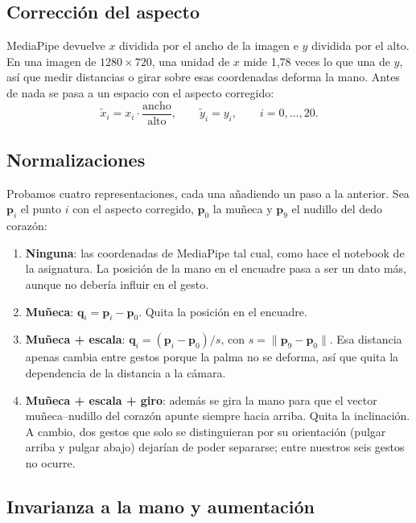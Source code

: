 \documentclass[11pt,a4paper]{article}
\begin{document}
\subsection{Corrección del aspecto}

MediaPipe devuelve $x$ dividida por el ancho de la imagen e $y$ dividida por el alto. En una imagen de
$1280\times720$, una unidad de $x$ mide 1,78 veces lo que una de $y$, así que medir distancias o girar sobre esas
coordenadas deforma la mano. Antes de nada se pasa a un espacio con el aspecto corregido:
\[
  \tilde{x}_i = x_i \cdot \frac{\text{ancho}}{\text{alto}}, \qquad \tilde{y}_i = y_i, \qquad i = 0, \dots, 20 .
\]

\subsection{Normalizaciones}

Probamos cuatro representaciones, cada una añadiendo un paso a la anterior. Sea $\mathbf{p}_i$ el punto $i$ con el
aspecto corregido, $\mathbf{p}_0$ la muñeca y $\mathbf{p}_9$ el nudillo del dedo corazón:

\begin{enumerate}
  \item \textbf{Ninguna}: las coordenadas de MediaPipe tal cual, como hace el notebook de la asignatura. La posición de
        la mano en el encuadre pasa a ser un dato más, aunque no debería influir en el gesto.
  \item \textbf{Muñeca}: $\mathbf{q}_i = \mathbf{p}_i - \mathbf{p}_0$. Quita la posición en el encuadre.
  \item \textbf{Muñeca + escala}: $\mathbf{q}_i = (\mathbf{p}_i - \mathbf{p}_0)/s$, con
        $s = \lVert \mathbf{p}_9 - \mathbf{p}_0 \rVert$. Esa distancia apenas cambia entre gestos porque la palma no se
        deforma, así que quita la dependencia de la distancia a la cámara.
  \item \textbf{Muñeca + escala + giro}: además se gira la mano para que el vector muñeca--nudillo del corazón apunte
        siempre hacia arriba. Quita la inclinación. A cambio, dos gestos que solo se distinguieran por su orientación
        (pulgar arriba y pulgar abajo) dejarían de poder separarse; entre nuestros seis gestos no ocurre.
\end{enumerate}

\subsection{Invarianza a la mano y aumentación}
\end{document}
